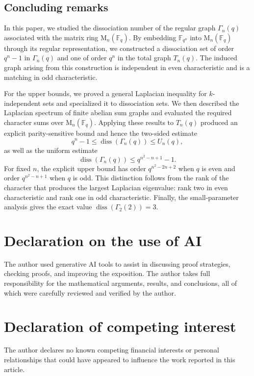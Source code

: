 \documentclass[11pt]{article}
\theoremstyle{definition}
\DeclareMathOperator{\diss}{diss}
\newcommand{\F}{\mathbb{F}}
\newcommand{\Mat}{\mathrm{M}}
\begin{document}
\subsection{Concluding remarks}

In this paper, we studied the dissociation number of the regular graph
$\Gamma_n(q)$ associated with the matrix ring $\Mat_n(\F_q)$.  By embedding
$\F_{q^n}$ into $\Mat_n(\F_q)$ through its regular representation, we
constructed a dissociation set of order $q^n-1$ in $\Gamma_n(q)$ and one of
order $q^n$ in the total graph $T_n(q)$.  The induced graph arising from
this construction is independent in even characteristic and is a matching
in odd characteristic.

For the upper bounds, we proved a general Laplacian inequality for
$k$-independent sets and specialized it to dissociation sets.  We then
described the Laplacian spectrum of finite abelian sum graphs and evaluated
the required character sums over $\Mat_n(\F_q)$.  Applying these results to
$T_n(q)$ produced an explicit parity-sensitive bound and hence the
two-sided estimate
\[
  q^n-1\le\diss(\Gamma_n(q))\le U_n(q),
\]
as well as the uniform estimate
\[
  \diss(\Gamma_n(q))\le q^{n^2-n+1}-1.
\]
For fixed $n$, the explicit upper bound has order
$q^{n^2-2n+2}$ when $q$ is even and order $q^{n^2-n+1}$ when $q$ is odd.
This distinction follows from the rank of the character that produces the
largest Laplacian eigenvalue: rank two in even characteristic and rank one
in odd characteristic.  Finally, the small-parameter analysis gives the
exact value $\diss(\Gamma_2(2))=3$.

\section*{Declaration on the use of AI}
The author used generative AI tools to assist in discussing proof strategies, checking proofs, and improving the exposition. The author takes full responsibility for the mathematical arguments, results, and conclusions, all of which were carefully reviewed and verified by the author.

\section*{Declaration of competing interest}

The author declares no known competing financial interests or personal relationships that could have appeared to influence the work reported in this article.
\end{document}
